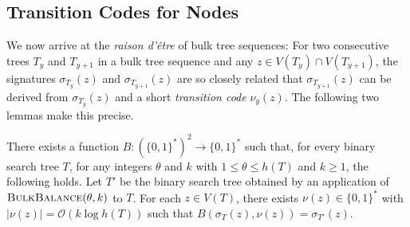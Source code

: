 \documentclass[10pt, conference, compsocconf]{IEEEtran}
\newcommand{\Oh}{\mathcal{O}}
\let\leq\leqslant
\let\geq\geqslant
\begin{document}
\subsection{Transition Codes for Nodes}

We now arrive at the \emph{raison d'être} of bulk tree sequences:  For two consecutive trees $T_y$ and $T_{y+1}$ in a bulk tree sequence and any $z\in V(T_y)\cap V(T_{y+1})$, the signatures $\sigma_{T_y}(z)$ and $\sigma_{T_{y+1}}(z)$ are so closely related that $\sigma_{T_{y+1}}(z)$ can be derived from $\sigma_{T_y}(z)$ and a short \emph{transition code} $\nu_y(z)$.  The following two lemmas make this precise.

\begin{lem}
  There exists a function $B:(\{0,1\}^*)^2\to\{0,1\}^*$ such that,
  for every binary search tree $T$, for any integers $\theta$ and $k$ with $1\leq \theta \leq h(T)$ and $k\geq1$, the following holds.
  Let $T'$ be the binary search tree obtained by an application of $\textsc{BulkBalance}(\theta,k)$ to $T$.
  For each $z\in V(T)$, there exists $\nu(z)\in\{0,1\}^*$ with $|\nu(z)| = \Oh(k\log h(T))$ such that $B(\sigma_{T}(z), \nu(z)) = \sigma_{T'}(z)$.
\end{lem}



\end{document}
